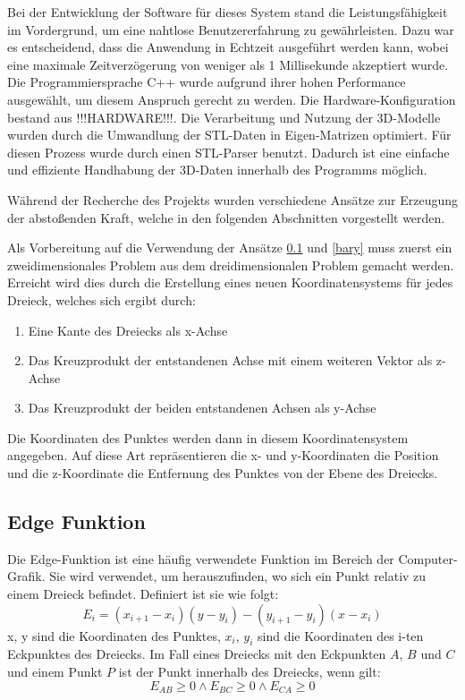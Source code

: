\documentclass[conference]{IEEEtran}
\begin{document}
Bei der Entwicklung der Software für dieses System stand die Leistungsfähigkeit im Vordergrund, um eine nahtlose Benutzererfahrung zu gewährleisten. Dazu war es entscheidend, dass die Anwendung in Echtzeit ausgeführt werden kann, wobei eine maximale 
Zeitverzögerung von weniger als 1 Millisekunde akzeptiert wurde. Die Programmiersprache 
C++ wurde aufgrund ihrer hohen Performance ausgewählt, um diesem Anspruch gerecht zu werden. 
Die Hardware-Konfiguration bestand aus !!!HARDWARE!!!.
Die Verarbeitung und Nutzung der 3D-Modelle wurden durch die Umwandlung der STL-Daten in 
Eigen-Matrizen optimiert. Für diesen Prozess wurde durch einen STL-Parser benutzt. Dadurch ist eine einfache und effiziente Handhabung der 3D-Daten innerhalb des Programms möglich.

Während der Recherche des Projekts wurden verschiedene Ansätze zur Erzeugung der abstoßenden Kraft, welche in den folgenden Abschnitten vorgestellt werden.

Als Vorbereitung auf die Verwendung der Ansätze \ref*{edge} und \ref*{bary} muss zuerst ein zweidimensionales Problem aus dem dreidimensionalen Problem gemacht werden. Erreicht wird dies durch die Erstellung eines neuen Koordinatensystems für jedes Dreieck, welches sich ergibt durch:
\begin{enumerate}
    \item Eine Kante des Dreiecks als x-Achse
    \item Das Kreuzprodukt der entstandenen Achse mit einem weiteren Vektor als z-Achse
    \item Das Kreuzprodukt der beiden entstandenen Achsen als y-Achse
\end{enumerate}
Die Koordinaten des Punktes werden dann in diesem Koordinatensystem angegeben. Auf diese Art 
repräsentieren die x- und y-Koordinaten die Position und die z-Koordinate die Entfernung des Punktes 
von der Ebene des Dreiecks. 

\subsection{Edge Funktion}\label{edge}
Die Edge-Funktion ist eine häufig verwendete Funktion im Bereich der Computer-Grafik. Sie wird 
verwendet, um herauszufinden, wo sich ein Punkt relativ zu einem Dreieck befindet. Definiert ist 
sie wie folgt:
\begin{equation}
    E_{i} = (x_{i+1} - x_{i})(y - y_{i}) - (y_{i+1} - y_{i})(x - x_{i})
\end{equation}
x, y sind die Koordinaten des Punktes, $x_{i}$, $y_{i}$ sind die Koordinaten des i-ten Eckpunktes 
des Dreiecks.
Im Fall eines Dreiecks mit den Eckpunkten $A$, $B$ und $C$ und einem Punkt $P$ ist der Punkt innerhalb 
des Dreiecks, wenn gilt:
\begin{equation}
    E_{AB} \geq 0 \land E_{BC} \geq 0 \land E_{CA} \geq 0
\end{equation}
\end{document}
